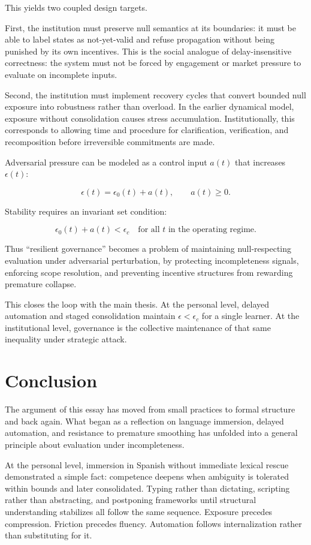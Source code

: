 \documentclass[12pt]{article}
\begin{document}
This yields two coupled design targets.

First, the institution must preserve null semantics at its boundaries: it must be able to label states as not-yet-valid and refuse propagation without being punished by its own incentives. This is the social analogue of delay-insensitive correctness: the system must not be forced by engagement or market pressure to evaluate on incomplete inputs.

Second, the institution must implement recovery cycles that convert bounded null exposure into robustness rather than overload. In the earlier dynamical model, exposure without consolidation causes stress accumulation. Institutionally, this corresponds to allowing time and procedure for clarification, verification, and recomposition before irreversible commitments are made.

Adversarial pressure can be modeled as a control input $a(t)$ that increases $\epsilon(t)$:

\[
\epsilon(t) = \epsilon_0(t) + a(t),
\qquad
a(t) \ge 0.
\]

Stability requires an invariant set condition:

\[
\epsilon_0(t) + a(t) < \epsilon_c
\quad \text{for all } t \text{ in the operating regime}.
\]

Thus ``resilient governance'' becomes a problem of maintaining null-respecting evaluation under adversarial perturbation, by protecting incompleteness signals, enforcing scope resolution, and preventing incentive structures from rewarding premature collapse.

This closes the loop with the main thesis. At the personal level, delayed automation and staged consolidation maintain $\epsilon < \epsilon_c$ for a single learner. At the institutional level, governance is the collective maintenance of that same inequality under strategic attack.

\section*{Conclusion}

The argument of this essay has moved from small practices to formal structure and back again. What began as a reflection on language immersion, delayed automation, and resistance to premature smoothing has unfolded into a general principle about evaluation under incompleteness.

At the personal level, immersion in Spanish without immediate lexical rescue demonstrated a simple fact: competence deepens when ambiguity is tolerated within bounds and later consolidated. Typing rather than dictating, scripting rather than abstracting, and postponing frameworks until structural understanding stabilizes all follow the same sequence. Exposure precedes compression. Friction precedes fluency. Automation follows internalization rather than substituting for it.
\end{document}
